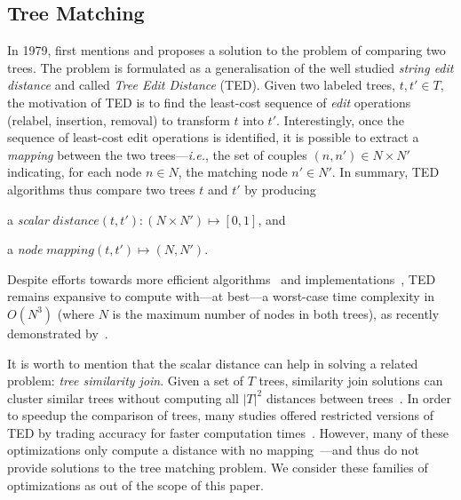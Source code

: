 \documentclass{vldb}
\begin{document}
\subsection{Tree Matching}\label{sec:tree_matching}
In 1979, \cite{Tai1979} first mentions and proposes a solution to the problem of comparing two trees.
The problem is formulated as a generalisation of the well studied \emph{string edit distance} and called \emph{Tree Edit Distance} (TED).
Given two labeled trees, $t,t' \in T$, the motivation of TED is to find the least-cost sequence of \emph{edit} operations (relabel, insertion, removal) to transform $t$ into $t'$.
Interestingly, once the sequence of least-cost edit operations is identified, it is possible to extract a \textit{mapping} between the two trees---\emph{i.e.}, the set of couples $(n, n') \in N \times N'$ indicating, for each node $n \in N$, the matching node $n' \in N'$.
In summary, TED algorithms thus compare two trees $t$ and $t'$ by producing
\begin{inparaenum}[\em (a)]
\item a \emph{scalar} $distance(t, t'):(N \times N') \mapsto [0,1]$, and
\item a \emph{node}  $mapping(t, t') \mapsto (N,N')$.
\end{inparaenum}

Despite efforts towards more efficient algorithms~\cite{zhang1995algorithms} and implementations~\cite{Pawlik2011, pawlik2015efficient, pawlik2016tree}, TED remains expansive to compute with---at best---a worst-case time complexity in $O(N^3)$ (where $N$ is the maximum number of nodes in both trees), as recently demonstrated by~\cite{bringmann2018tree}.

It is worth to mention that the scalar distance can help in solving a related problem: \emph{tree similarity join}.
Given a set of $T$ trees, similarity join solutions can cluster similar trees without computing all $|T|^2$ distances between trees~\cite{Guha2002ApproximateJoins,Hutter2019EffectiveJoins,Kailing2004EfficientDatabases,Tang2015ScalingData,Yang2005SimilarityData}.
In order to speedup the comparison of trees, many studies offered restricted versions of TED by trading accuracy for faster computation times~\cite{augsten2008pq,jiang1994alignment,reis2004automatic,selkow1977tree,valiente2001efficient,zhang1995algorithms, zhang1996constrained}.
However, many of these optimizations only compute a distance with no mapping~\cite{augsten2008pq, Wang2001FindingHierarchy, Garofalakis2005XMLEmbeddings}---and thus do not provide solutions to the tree matching problem.
We consider these families of optimizations as out of the scope of this paper.
\end{document}
